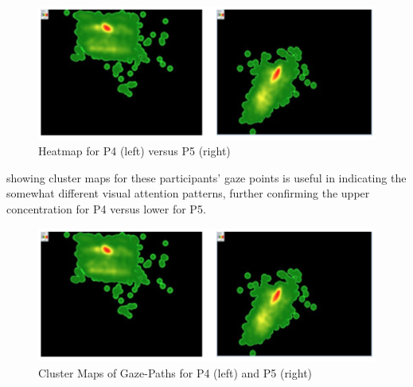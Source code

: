 \documentclass[output=paper]{langsci/langscibook}
\begin{document}
\newpage
\begin{figure}[t]
 \includegraphics[width=\textwidth]{figures/OHagan6.png}
\caption{Heatmap for P4 (left) versus P5 (right)}
\label{ohagan:fig:6}
\end{figure}

 showing cluster maps for these participants' gaze points is useful in indicating the somewhat different visual attention patterns, further confirming the upper concentration for P4 versus lower for P5.


  
\begin{figure}[t]
 \includegraphics[width=\textwidth]{figures/OHagan6.png}
 \caption{Cluster Maps of Gaze-Paths for P4 (left) and P5 (right)}
\label{ohagan:fig:7}
\end{figure}
\end{document}
